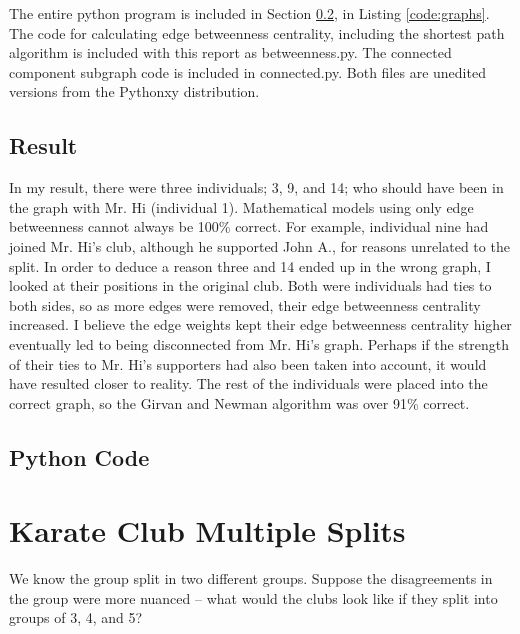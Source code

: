 \documentclass[paper=a4, fontsize=11pt]{scrartcl} %
\numberwithin{equation}{section} %
\numberwithin{figure}{section} %
\numberwithin{table}{section} %
\begin{document}
The entire python program is included in Section \ref{sec:graph-code}, in Listing \ref{code:graphs}.
The code for calculating edge betweenness centrality, including the shortest path algorithm is included with this report as betweenness.py.
The connected component subgraph code is included in connected.py. 
Both files are unedited versions from the Pythonxy distribution.

\subsection{Result}

In my result, there were three individuals; 3, 9, and 14; who should have been in the graph with Mr. Hi (individual 1).
Mathematical models using only edge betweenness cannot always be 100\% correct.  
For example, individual nine had joined Mr. Hi's club, although he supported John A., for reasons unrelated to the split.\cite{bib:zach-paper}
In order to deduce a reason three and 14 ended up in the wrong graph, I looked at their positions in the original club.
Both were individuals had ties to both sides, so as more edges were removed, their edge betweenness centrality increased.
I believe the edge weights kept their edge betweenness centrality higher eventually led to being disconnected from Mr. Hi's graph.
Perhaps if the strength of their ties to Mr. Hi's supporters had also been taken into account, it would have resulted closer to reality.
The rest of the individuals were placed into the correct graph, so the Girvan and Newman algorithm was over 91\% correct.

\newpage
\subsection{Python Code}
\label{sec:graph-code}



\newpage 

\section{Karate Club Multiple Splits}
We know the group split in two different groups.  Suppose the
disagreements in the group were more nuanced -- what would the clubs
look like if they split into groups of 3, 4, and 5?
\end{document}
